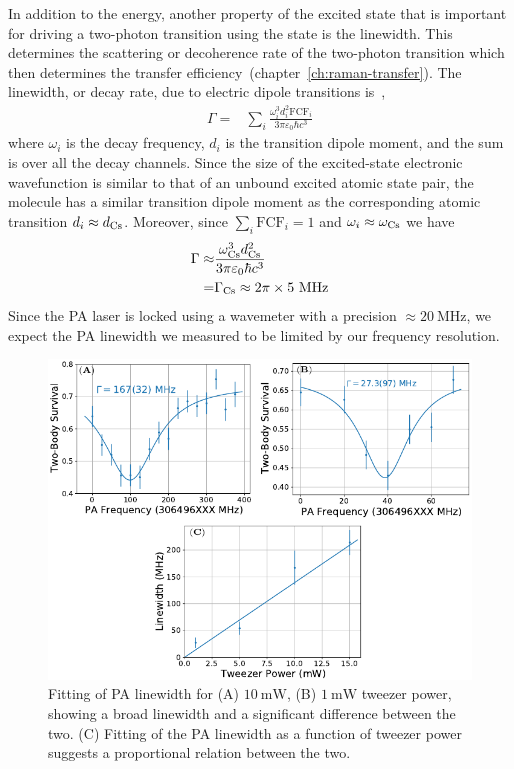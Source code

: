 In addition to the energy, another property of the excited state
that is important for driving a two-photon transition using the state is the linewidth.
This determines the scattering or decoherence rate of
the two-photon transition which then determines
the transfer efficiency~(chapter~\ref{ch:raman-transfer}).
The linewidth, or decay rate, due to electric dipole transitions
is~\cite[p.~197]{bransden_physics_2003},
\begin{align*}
  \Gamma=&\sum_{i}\frac{\omega_i^3d_i^2\mathrm{FCF}_i}{3\pi\varepsilon_0\hbar c^3}
\end{align*}
where $\omega_i$ is the decay frequency, $d_i$ is the transition dipole moment,
and the sum is over all the decay channels.
Since the size of the excited-state electronic wavefunction is similar to
that of an unbound excited atomic state pair,
the molecule has a similar transition dipole moment as the corresponding atomic transition
$d_i\approx d_{\mathrm{Cs}}$. Moreover, since $\sum_i\mathrm{FCF}_i=1$ and $\omega_i\approx\omega_{\mathrm{Cs}}$
we have
\begin{align*}
  \Gamma\approx&\frac{\omega_{\mathrm{Cs}}^3d_{\mathrm{Cs}}^2}{3\pi\varepsilon_0\hbar c^3}\\
  =&\Gamma_{\mathrm{Cs}}\approx2\pi\times5~\mathrm{MHz}
\end{align*}
Since the PA laser is locked using a wavemeter with a precision
$\approx\!20~\mathrm{MHz}$, we expect the PA linewidth we measured to be limited
by our frequency resolution.

\begin{figure}
  \centering
  \includegraphics[width=\textwidth]{figures/pa_linewidth_red_twr.pdf}
  \caption[PA linewidth for red detuned tweezer]{
    Fitting of PA linewidth for (A) $10~\mathrm{mW}$, (B) $1~\mathrm{mW}$ tweezer power,
    showing a broad linewidth and a significant difference between the two.
    (C) Fitting of the PA linewidth as a function of tweezer power suggests
    a proportional relation between the two.
    \label{fig:pa:linewidth:red-twr}}
\end{figure}


